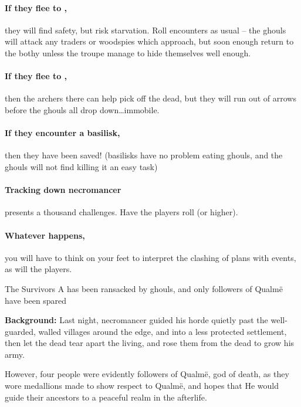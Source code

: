 \paragraph{If they flee to ,}
they will find safety, but risk starvation.
Roll encounters as usual -- the ghouls will attack any traders or woodspies which approach, but soon enough return to the \gls{bothy} unless the troupe manage to hide themselves well enough.

\paragraph{If they flee to ,}
then the archers there can help pick off the dead, but they will run out of arrows before the ghouls all drop down\ldots immobile.

\paragraph{If they encounter a basilisk,}
then they have been saved!
(basilisks have no problem eating ghouls, and the ghouls will not find killing it an easy task)

\paragraph{Tracking down \gls{necromancer}}
presents a thousand challenges.
Have the players roll  (\tn[14] or higher).

\paragraph{Whatever happens,}
you will have to think on your feet to interpret the clashing of plans with events, as will the players.

{The Survivors}%
{A  has been ransacked by ghouls, and only followers of Qualm\"{e} have been spared}%

\textbf{Background:}
Last night, \gls{necromancer} guided his horde quietly past the well-guarded, walled \glspl{village} around the \gls{edge}, and into a less protected settlement, then let the dead tear apart the living, and rose them from the dead to grow his army.

However, four people were evidently followers of Qualm\"{e}, god of death, as they wore medallions made to show respect to Qualm\"{e}, and hopes that He would guide their ancestors to a peaceful realm in the afterlife.

